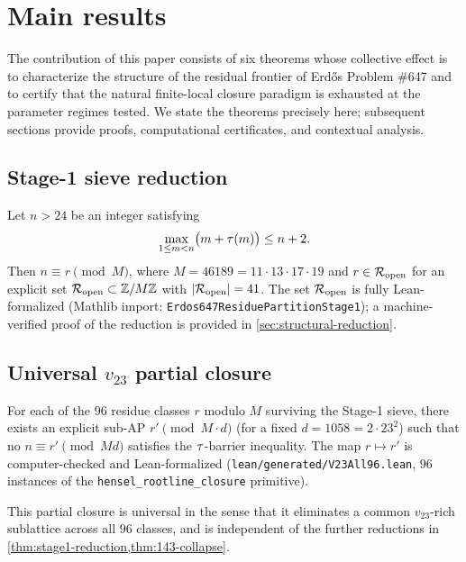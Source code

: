 
\section{Main results}
\label{sec:main}

The contribution of this paper consists of six theorems whose
collective effect is to characterize the structure of the residual
frontier of Erd\H{o}s Problem \#647 and to certify that the natural
finite-local closure paradigm is exhausted at the parameter regimes
tested. We state the theorems precisely here; subsequent sections
provide proofs, computational certificates, and contextual analysis.

\subsection{Stage-1 sieve reduction}
\label{sec:thm:stage1}

\begin{theorem}
\label{thm:stage1-reduction}
Let $n > 24$ be an integer satisfying
\[
\max_{1 \le m < n} \bigl( m + \tau(m) \bigr) \le n + 2 .
\]
Then $n \equiv r \pmod{M}$, where $M = 46189 = 11 \cdot 13 \cdot 17 \cdot 19$
and $r \in \mathcal{R}_{\mathrm{open}}$ for an explicit set $\mathcal{R}_{\mathrm{open}} \subset \mathbb{Z} / M\mathbb{Z}$ with
$|\mathcal{R}_{\mathrm{open}}| = 41$. The set $\mathcal{R}_{\mathrm{open}}$ is fully Lean-formalized
(Mathlib import: \texttt{Erdos647ResiduePartitionStage1}); a
machine-verified proof of the reduction
is provided in \cref{sec:structural-reduction}.
\end{theorem}

\subsection{Universal $v_{23}$ partial closure}
\label{sec:thm:v23}

\begin{theorem}
\label{thm:v23-partial-closure}
For each of the $96$ residue classes $r$ modulo $M$ surviving the
Stage-1 sieve, there exists an explicit
sub-AP $r' \pmod{M \cdot d}$ (for a fixed $d = 1058 = 2 \cdot 23^2$)
such that no $n \equiv r' \pmod{M d}$ satisfies the
$\tau$-barrier inequality. The map $r \mapsto r'$ is computer-checked
and Lean-formalized
(\texttt{lean/generated/V23All96.lean}, $96$ instances of the
\texttt{hensel\_rootline\_closure} primitive).

This partial closure is universal in the sense that it eliminates a
common $v_{23}$-rich sublattice across all $96$ classes, and is
independent of the further reductions in
\cref{thm:stage1-reduction,thm:143-collapse}.
\end{theorem}

